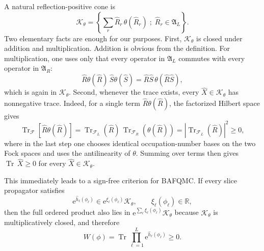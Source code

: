 \documentclass[twocolumn,aps,prb,10pt,amsmath,amssymb,amsthm,superscriptaddress]{revtex4-2}
\newcommand{\Tr}{\operatorname{Tr}}
\newcommand{\ee}{\mathrm{e}}
\newcommand{\mc}[1]{\mathcal{#1}}
\theoremstyle{remark}
\begin{document}
A natural reflection-positive cone is
\begin{equation}
    \mc K_\theta = \left\{\sum_r \hat R_r\,\theta(\hat R_r)\;;\; \hat R_r\in\mathfrak A_L\right\}.
    \label{eq:cone_def}
\end{equation}
Two elementary facts are enough for our purposes. First, $\mc K_\theta$ is closed under addition and multiplication. Addition is obvious from the definition. For multiplication, one uses only that every operator in $\mathfrak A_L$ commutes with every operator in $\mathfrak A_R$:
\begin{equation}
    \hat R\theta(\hat R)\,\hat S\theta(\hat S)
    = \hat R\hat S\,\theta(\hat R\hat S),
\end{equation}
which is again in $\mc K_\theta$. Second, whenever the trace exists, every $\hat X\in\mc K_\theta$ has nonnegative trace. Indeed, for a single term $\hat R\theta(\hat R)$, the factorized Hilbert space gives
\begin{equation}
    \Tr_{\mc F}\!\left[\hat R\theta(\hat R)\right]
    = \Tr_{\mc F_L}(\hat R)\,\Tr_{\mc F_R}(\theta(\hat R))
    = \left|\Tr_{\mc F_L}(\hat R)\right|^2 \ge 0,
\end{equation}
where in the last step one chooses identical occupation-number bases on the two Fock spaces and uses the antilinearity of $\theta$. Summing over terms then gives $\Tr\,\hat X\ge 0$ for every $\hat X\in \mc K_\theta$.

This immediately leads to a sign-free criterion for BAFQMC. If every slice propagator satisfies
\begin{equation}
    \ee^{\hat h_\ell(\phi_\ell)} \in \ee^{\xi_\ell(\phi_\ell)}\mc K_\theta,
    \qquad
    \xi_\ell(\phi_\ell)\in\mathbb R,
    \label{eq:rp_slice_condition}
\end{equation}
then the full ordered product also lies in $\ee^{\sum_\ell \xi_\ell(\phi_\ell)}\mc K_\theta$ because $\mc K_\theta$ is multiplicatively closed, and therefore
\begin{equation}
    W(\phi)=\Tr\prod_{\ell=1}^{L}\ee^{\hat h_\ell(\phi_\ell)}\ge 0.
    \label{eq:rp_weight_nonnegative}
\end{equation}
\end{document}
